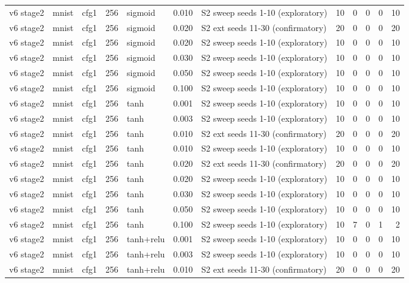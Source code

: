 \begin{table}[htbp]
{\begin{tabular}{@{}lllrlrlrrrrr@{}}
v6 stage2 & mnist & cfg1 & 256 & sigmoid & 0.010 & S2 sweep seeds 1-10 (exploratory) & 10 & 0 & 0 & 0 & 10 \\
v6 stage2 & mnist & cfg1 & 256 & sigmoid & 0.020 & S2 ext seeds 11-30 (confirmatory) & 20 & 0 & 0 & 0 & 20 \\
v6 stage2 & mnist & cfg1 & 256 & sigmoid & 0.020 & S2 sweep seeds 1-10 (exploratory) & 10 & 0 & 0 & 0 & 10 \\
v6 stage2 & mnist & cfg1 & 256 & sigmoid & 0.030 & S2 sweep seeds 1-10 (exploratory) & 10 & 0 & 0 & 0 & 10 \\
v6 stage2 & mnist & cfg1 & 256 & sigmoid & 0.050 & S2 sweep seeds 1-10 (exploratory) & 10 & 0 & 0 & 0 & 10 \\
v6 stage2 & mnist & cfg1 & 256 & sigmoid & 0.100 & S2 sweep seeds 1-10 (exploratory) & 10 & 0 & 0 & 0 & 10 \\
v6 stage2 & mnist & cfg1 & 256 & tanh & 0.001 & S2 sweep seeds 1-10 (exploratory) & 10 & 0 & 0 & 0 & 10 \\
v6 stage2 & mnist & cfg1 & 256 & tanh & 0.003 & S2 sweep seeds 1-10 (exploratory) & 10 & 0 & 0 & 0 & 10 \\
v6 stage2 & mnist & cfg1 & 256 & tanh & 0.010 & S2 ext seeds 11-30 (confirmatory) & 20 & 0 & 0 & 0 & 20 \\
v6 stage2 & mnist & cfg1 & 256 & tanh & 0.010 & S2 sweep seeds 1-10 (exploratory) & 10 & 0 & 0 & 0 & 10 \\
v6 stage2 & mnist & cfg1 & 256 & tanh & 0.020 & S2 ext seeds 11-30 (confirmatory) & 20 & 0 & 0 & 0 & 20 \\
v6 stage2 & mnist & cfg1 & 256 & tanh & 0.020 & S2 sweep seeds 1-10 (exploratory) & 10 & 0 & 0 & 0 & 10 \\
v6 stage2 & mnist & cfg1 & 256 & tanh & 0.030 & S2 sweep seeds 1-10 (exploratory) & 10 & 0 & 0 & 0 & 10 \\
v6 stage2 & mnist & cfg1 & 256 & tanh & 0.050 & S2 sweep seeds 1-10 (exploratory) & 10 & 0 & 0 & 0 & 10 \\
v6 stage2 & mnist & cfg1 & 256 & tanh & 0.100 & S2 sweep seeds 1-10 (exploratory) & 10 & 7 & 0 & 1 & 2 \\
v6 stage2 & mnist & cfg1 & 256 & tanh+relu & 0.001 & S2 sweep seeds 1-10 (exploratory) & 10 & 0 & 0 & 0 & 10 \\
v6 stage2 & mnist & cfg1 & 256 & tanh+relu & 0.003 & S2 sweep seeds 1-10 (exploratory) & 10 & 0 & 0 & 0 & 10 \\
v6 stage2 & mnist & cfg1 & 256 & tanh+relu & 0.010 & S2 ext seeds 11-30 (confirmatory) & 20 & 0 & 0 & 0 & 20 \\

\end{tabular}}
\end{table}

